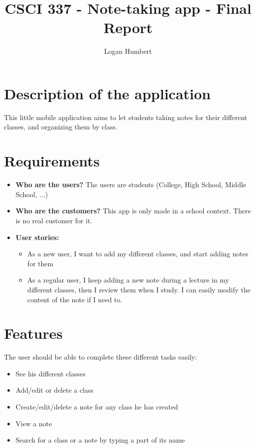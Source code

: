 \documentclass[]{article}
\title{CSCI 337 - Note-taking app - Final Report}
\author{Logan Humbert}
\begin{document}
	
	\maketitle
	
	\pagebreak
	
	\tableofcontents
	
	\listoffigures
	
	\pagebreak
	
	\section{Description of the application}
	
	This little mobile application aims to let students taking notes for their different classes, and organizing them by class.
	
	\section{Requirements}
	
	\begin{itemize}
		\item \textbf{Who are the users? } The users are students (College, High School, Middle School, ...)
		
		\item \textbf{Who are the customers?} This app is only made in a school context. There is no real customer for it.
		
		\item  \textbf{User stories:}
			\begin{itemize}
				\item As a new user, I want to add my different classes, and start adding notes for them
				
				\item  As a regular user, I keep adding a new note during a lecture in my different classes, then I review them when I study.
				I can easily modify the content of the note if I need to.
			\end{itemize}
		
	\end{itemize}
	
	\section{Features}
	
	The user should be able to complete these different tasks easily:
	
	\begin{itemize}
		\item See his different classes
		\item Add/edit or delete a class
		\item Create/edit/delete a note for any class he has created
		\item View a note
		\item  Search for a class or a note by typing a part of its name
	\end{itemize}
	
\end{document}
